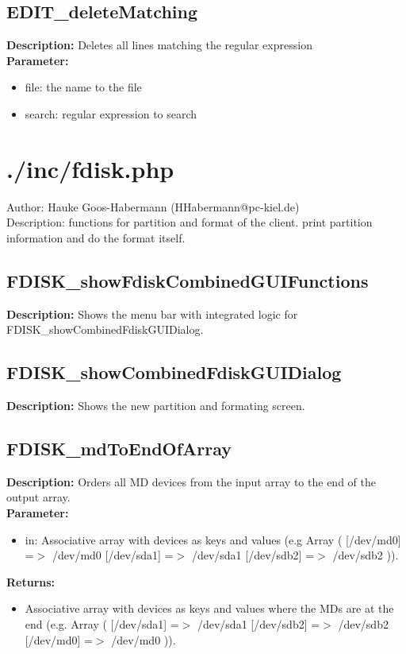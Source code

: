 \subsection{EDIT\_deleteMatching}
\textbf{Description:} Deletes all lines matching the regular expression\\
\textbf{Parameter:}
\begin{itemize}
\item file: the name to the file
\item search: regular expression to search
\end{itemize}

\newpage\section{./inc/fdisk.php}
 Author: Hauke Goos-Habermann (HHabermann@pc-kiel.de)\\
 Description: functions for partition and format of the client. print partition information and do the format itself.\\

\subsection{FDISK\_showFdiskCombinedGUIFunctions}
\textbf{Description:} Shows the menu bar with integrated logic for FDISK\_showCombinedFdiskGUIDialog.\\

\subsection{FDISK\_showCombinedFdiskGUIDialog}
\textbf{Description:} Shows the new partition and formating screen.\\

\subsection{FDISK\_mdToEndOfArray}
\textbf{Description:} Orders all MD devices from the input array to the end of the output array.\\
\textbf{Parameter:}
\begin{itemize}
\item in: Associative array with devices as keys and values (e.g Array ( [/dev/md0] =$>$ /dev/md0 [/dev/sda1] =$>$ /dev/sda1 [/dev/sdb2] =$>$ /dev/sdb2 )).
\end{itemize}
\textbf{Returns:}
\begin{itemize}
\item Associative array with devices as keys and values where the MDs are at the end (e.g. Array ( [/dev/sda1] =$>$ /dev/sda1 [/dev/sdb2] =$>$ /dev/sdb2 [/dev/md0] =$>$ /dev/md0 )).
\end{itemize}

